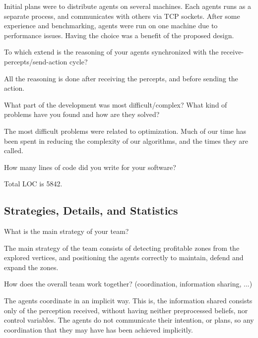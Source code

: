 Initial plans were to distribute agents on several
machines. Each agents runs as a separate process, and communicates with others
via TCP sockets. After some experience and benchmarking, agents were run on one
machine due to performance issues. Having the choice was a benefit of the
proposed design.

\begin{question}
To which extend is the reasoning of your agents synchronized with the
receive-percepts/send-action cycle?
\end{question}

All the reasoning is done after receiving the percepts, and before sending the
action.


\begin{question}
What part of the development was most difficult/complex? What kind of
problems have you found and how are they solved?  
\end{question}

The most difficult problems
were related to optimization. Much of our time has been spent in reducing the
complexity of our algorithms, and the times they are called.

\begin{question}
How many lines of code did you write for your software?  
\end{question}

Total LOC is 5842.

\subsection{Strategies, Details, and Statistics}
\setcounter{question}{0}
\begin{question}
What is the main strategy of your team?
\end{question}

The main strategy of the team consists of detecting profitable zones
from the explored vertices, and positioning the agents correctly to maintain,
defend and expand the zones.

\begin{question}
How does the overall team work together? (coordination, information
sharing, ...) 
\end{question}

The agents coordinate in an implicit way. This is, the  information shared 
consists only of the perception received, without having neither 
preprocessed beliefs, nor control variables. The agents do not communicate
their intention, or plans, so any coordination that they may have has been
achieved implicitly.


